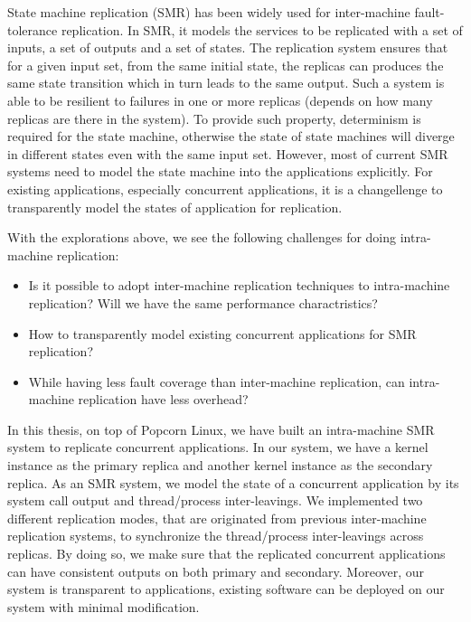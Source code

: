 State machine replication (SMR) has been widely used for inter-machine fault-tolerance replication. In SMR, it models the services to be replicated with a set of inputs, a set of outputs and a set of states. The replication system ensures that for a given input set, from the same initial state, the replicas can produces the same state transition which in turn leads to the same output. Such a system is able to be resilient to failures in one or more replicas (depends on how many replicas are there in the system). To provide such property, determinism is required for the state machine, otherwise the state of state machines will diverge in different states even with the same input set. However, most of current SMR systems need to model the state machine into the applications explicitly. For existing applications, especially concurrent applications, it is a changellenge to transparently model the states of application for replication.

With the explorations above, we see the following challenges for doing intra-machine replication:
\begin{itemize}
\item Is it possible to adopt inter-machine replication techniques to intra-machine replication? Will we have the same performance charactristics?
\item How to transparently model existing concurrent applications for SMR replication?
\item While having less fault coverage than inter-machine replication, can intra-machine replication have less overhead?
\end{itemize}

In this thesis, on top of Popcorn Linux, we have built an intra-machine SMR system to replicate concurrent applications. In our system, we have a kernel instance as the primary replica and another kernel instance as the secondary replica. As an SMR system, we model the state of a concurrent application by its system call output and thread/process inter-leavings. We implemented two different replication modes, that are originated from previous inter-machine replication systems, to synchronize the thread/process inter-leavings across replicas. By doing so, we make sure that the replicated concurrent applications can have consistent outputs on both primary and secondary. Moreover, our system is transparent to applications, existing software can be deployed on our system with minimal modification.


